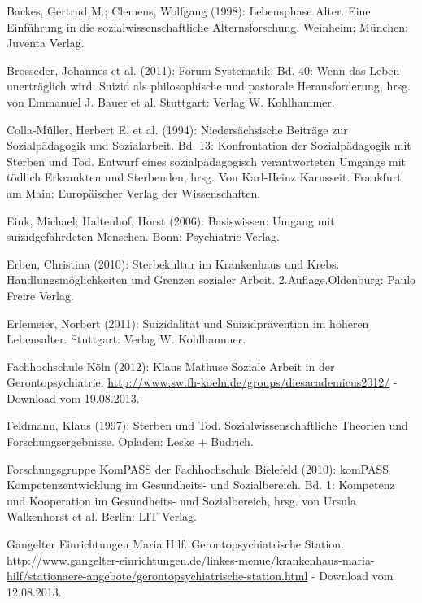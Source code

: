 \begin{thebibliography}{99}

	 Backes, Gertrud M.; Clemens, Wolfgang (1998): Lebensphase Alter. Eine Einführung in die sozialwissenschaftliche Alternsforschung. Weinheim; München: Juventa Verlag.
	
	 Brosseder, Johannes et al. (2011): Forum Systematik. Bd. 40: Wenn das Leben unerträglich wird. Suizid als philosophische und pastorale Herausforderung, hrsg. von Emmanuel J. Bauer et al. Stuttgart: Verlag W. Kohlhammer.
	
	 Colla-Müller, Herbert E. et al. (1994): Niedersächsische Beiträge zur Sozialpädagogik und Sozialarbeit. Bd. 13: Konfrontation der Sozialpädagogik mit Sterben und Tod. Entwurf eines sozialpädagogisch verantworteten Umgangs mit tödlich Erkrankten und Sterbenden, hrsg. Von Karl-Heinz Karusseit. Frankfurt am Main: Europäischer Verlag der Wissenschaften.
	
	 Eink, Michael; Haltenhof, Horst (2006): Basiswissen: Umgang mit suizidgefährdeten Menschen. Bonn: Psychiatrie-Verlag.
	
	 Erben, Christina (2010): Sterbekultur im Krankenhaus und Krebs. Handlungsmöglichkeiten und Grenzen sozialer Arbeit. 2.Auflage.Oldenburg: Paulo Freire Verlag.
	
	 Erlemeier, Norbert (2011): Suizidalität und Suizidprävention im höheren Lebensalter. Stuttgart: Verlag W. Kohlhammer. 
	
	 Fachhochschule Köln (2012): Klaus Mathuse Soziale Arbeit in der Gerontopsychiatrie. \url{http://www.sw.fh-koeln.de/groups/diesacademicus2012/} - Download vom 19.08.2013.
	
	 Feldmann, Klaus (1997): Sterben und Tod. Sozialwissenschaftliche Theorien und Forschungsergebnisse. Opladen: Leske + Budrich.
	
	 Forschungsgruppe KomPASS der Fachhochschule Bielefeld (2010): komPASS Kompetenzentwicklung im Gesundheits- und Sozialbereich. Bd. 1: Kompetenz und Kooperation im Gesundheits- und Sozialbereich, hrsg. von Ursula Walkenhorst et al. Berlin: LIT Verlag.
	
	 Gangelter Einrichtungen Maria Hilf. Gerontopsychiatrische Station. \url{http://www.gangelter-einrichtungen.de/linkes-menue/krankenhaus-maria-hilf/stationaere-angebote/gerontopsychiatrische-station.html} - Download vom 12.08.2013.
	

\end{thebibliography}
